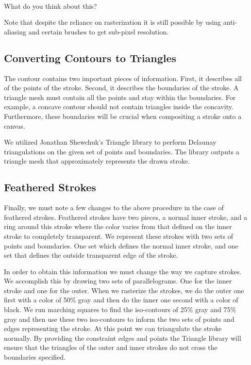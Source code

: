 \documentclass[conference]{acmsiggraph}
\begin{document}
\\

What do you think about this?

Note that despite the reliance on rasterization it is still possible by using
anti-aliasing and certain brushes to get sub-pixel resolution.

\subsection{Converting Contours to Triangles}
The contour contains two important pieces of information. First, it describes all of the points of the stroke.
Second, it describes the boundaries of the stroke. A triangle mesh must contain all the points and stay
within the boundaries. For example, a concave contour should not contain triangles inside the concavity.
Furthermore, these boundaries will be crucial when compositing a stroke onto a canvas.

We utilized Jonathan Shewchuk's Triangle library to perform Delaunay triangulations
on the given set of points and boundaries. The library outputs a triangle mesh that
approximately represents the drawn stroke.

\subsection{Feathered Strokes}
Finally, we must note a few changes to the above procedure in the case of feathered strokes.
Feathered strokes have two pieces, a normal inner stroke, and a ring around this stroke
where the color varies from that defined on the inner stroke to completely transparent. We
represent these strokes with two sets of points and boundaries. One set which defines the
normal inner stroke, and one set that defines the outside transparent edge of the stroke.

In order to obtain this information we must change the way we capture strokes. We accomplish
this by drawing two sets of parallelograms. One for the inner stroke and one for the outer.
When we rasterize the strokes, we do the outer one first with a color of 50\% gray and
then do the inner one second with a color of black. We run marching squares to find the
iso-contours of 25\% gray and 75\% gray and then use these two iso-contours to inform the
two sets of points and edges representing the stroke. At this point we can triangulate
the stroke normally. By providing the constraint edges and points the Triangle library will
ensure that the triangles of the outer and inner strokes do not cross the boundaries specified.
\end{document}
